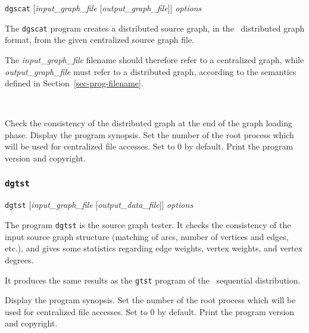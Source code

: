 \begin{itemize}
\progsyn
{\tt dgscat} [{\it input\_graph\_file} [{\it output\_graph\_file}]] {\it options}

\progdes

The {\tt dgscat} program creates a distributed source graph, in the
\scotch\ distributed graph format, from the given centralized source
graph file.

The {\it input\_graph\_file} filename should therefore refer to a
centralized graph, while {\it output\_graph\_file} must refer to a
distributed graph, according to the semantics defined in
Section~\ref{sec-prog-filename}.

\progopt\\[-1em]
\begin{itemize}
\iteme[{\tt -c}]
Check the consistency of the distributed graph at the end of the
graph loading phase.
\iteme[{\tt -h}]
Display the program synopsis.
\iteme[{\tt -r}{\it num}]
Set the number of the root process which will be used for centralized
file accesses. Set to $0$ by default.
\iteme[{\tt -V}]
Print the program version and copyright.
\end{itemize}
\end{itemize}

\subsubsection{{\tt dgtst}}

\begin{itemize}
\progsyn
{\tt dgtst} [{\it input\_graph\_file} [{\it output\_data\_file}]] {\it options}

\progdes

The program {\tt dgtst} is the source graph tester. It checks the
consistency of the input source graph structure (matching of arcs,
number of vertices and edges, etc\@.), and gives some statistics
regarding edge weights, vertex weights, and vertex degrees.

It produces the same results as the {\tt gtst} program of the
\scotch\ sequential distribution.

\progopt
\begin{itemize}
\iteme[{\tt -h}]
Display the program synopsis.
\iteme[{\tt -r}{\it num}]
Set the number of the root process which will be used for centralized
file accesses. Set to $0$ by default.
\iteme[{\tt -V}]
Print the program version and copyright.
\end{itemize}
\end{itemize}
